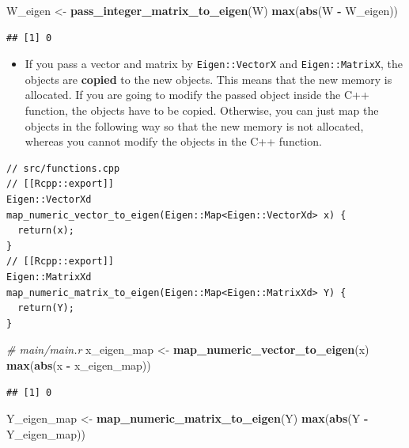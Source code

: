 \documentclass[]{book}
\newenvironment{Shaded}{\begin{snugshade}}{\end{snugshade}}
\newcommand{\KeywordTok}[1]{\textcolor[rgb]{0.13,0.29,0.53}{\textbf{#1}}}
\newcommand{\StringTok}[1]{\textcolor[rgb]{0.31,0.60,0.02}{#1}}
\newcommand{\CommentTok}[1]{\textcolor[rgb]{0.56,0.35,0.01}{\textit{#1}}}
\newcommand{\OperatorTok}[1]{\textcolor[rgb]{0.81,0.36,0.00}{\textbf{#1}}}
\newcommand{\NormalTok}[1]{#1}
\providecommand{\tightlist}{%
  \setlength{\itemsep}{0pt}\setlength{\parskip}{0pt}}
\begin{document}
\begin{Shaded}
\begin{Highlighting}[]
\NormalTok{W_eigen <-}\StringTok{ }\KeywordTok{pass_integer_matrix_to_eigen}\NormalTok{(W)}
\KeywordTok{max}\NormalTok{(}\KeywordTok{abs}\NormalTok{(W }\OperatorTok{-}\StringTok{ }\NormalTok{W_eigen))}
\end{Highlighting}
\end{Shaded}

\begin{verbatim}
## [1] 0
\end{verbatim}

\begin{itemize}
\tightlist
\item
  If you pass a vector and matrix by \texttt{Eigen::VectorX} and
  \texttt{Eigen::MatrixX}, the objects are \textbf{copied} to the new
  objects. This means that the new memory is allocated. If you are going
  to modify the passed object inside the C++ function, the objects have
  to be copied. Otherwise, you can just map the objects in the following
  way so that the new memory is not allocated, whereas you cannot modify
  the objects in the C++ function.
\end{itemize}

\begin{verbatim}
// src/functions.cpp
// [[Rcpp::export]]
Eigen::VectorXd map_numeric_vector_to_eigen(Eigen::Map<Eigen::VectorXd> x) {
  return(x);
}
// [[Rcpp::export]]
Eigen::MatrixXd map_numeric_matrix_to_eigen(Eigen::Map<Eigen::MatrixXd> Y) {
  return(Y);
}
\end{verbatim}

\begin{Shaded}
\begin{Highlighting}[]
\CommentTok{# main/main.r}
\NormalTok{x_eigen_map <-}\StringTok{ }\KeywordTok{map_numeric_vector_to_eigen}\NormalTok{(x)}
\KeywordTok{max}\NormalTok{(}\KeywordTok{abs}\NormalTok{(x }\OperatorTok{-}\StringTok{ }\NormalTok{x_eigen_map))}
\end{Highlighting}
\end{Shaded}

\begin{verbatim}
## [1] 0
\end{verbatim}

\begin{Shaded}
\begin{Highlighting}[]
\NormalTok{Y_eigen_map <-}\StringTok{ }\KeywordTok{map_numeric_matrix_to_eigen}\NormalTok{(Y)}
\KeywordTok{max}\NormalTok{(}\KeywordTok{abs}\NormalTok{(Y }\OperatorTok{-}\StringTok{ }\NormalTok{Y_eigen_map))}
\end{Highlighting}
\end{Shaded}
\end{document}
